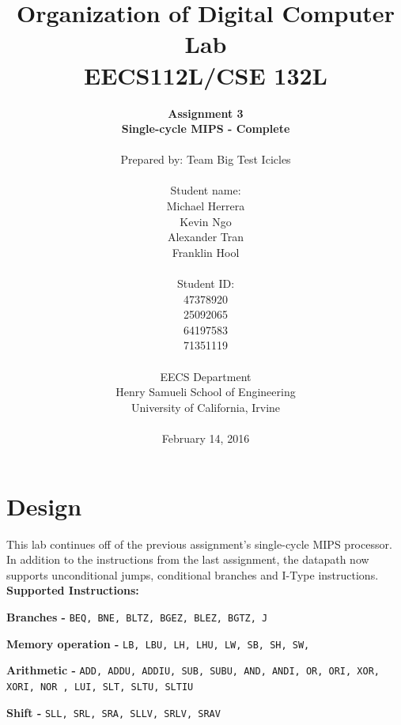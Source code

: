 \documentclass{article}
\begin{document}
\title{Organization of Digital Computer Lab \\ EECS112L/CSE 132L}
\author{\textbf{Assignment 3 }\\ \textbf{Single-cycle MIPS - Complete} \\ \\
Prepared by: Team Big Test Icicles \\ \\ Student name: \\ Michael Herrera \\ Kevin Ngo \\ Alexander Tran \\ Franklin Hool \\ \\ Student ID: \\ 47378920 \\ 25092065 \\ 64197583 \\ 71351119 \\ \\ 
EECS Department\\ Henry Samueli School of Engineering \\ University of California, Irvine \\ \\
{February 14, 2016}} 


\date{}
\maketitle


\section{Design}
 This lab continues off of the previous assignment's single-cycle MIPS processor. In addition to the instructions from the last assignment, the datapath now supports unconditional jumps, conditional branches and I-Type instructions.  
\\

\textbf{Supported Instructions:}

\textbf{Branches - }\texttt{BEQ, BNE, BLTZ, BGEZ, BLEZ, BGTZ, J}

\textbf{Memory operation - }\texttt{LB, LBU, LH, LHU, LW, SB, SH, SW, }

\textbf{Arithmetic - }\texttt{ADD, ADDU, ADDIU, SUB, SUBU, AND, ANDI, OR, ORI, XOR, XORI, NOR , LUI, SLT, SLTU, SLTIU}

\textbf{Shift - }\texttt{SLL, SRL, SRA, SLLV, SRLV, SRAV}
\end{document}
